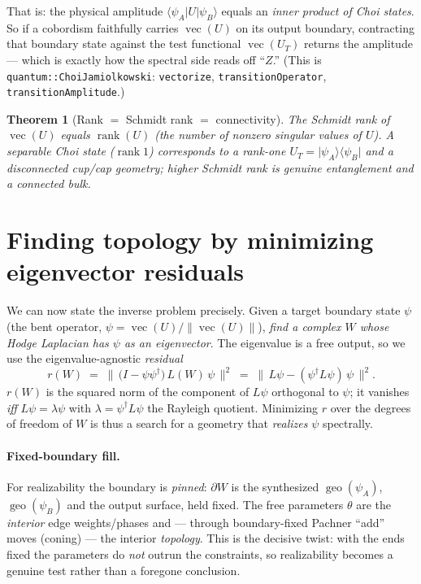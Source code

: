 \documentclass[11pt]{article}
\theoremstyle{plain}
\newtheorem{theorem}{Theorem}
\theoremstyle{definition}
\theoremstyle{remark}
\newcommand{\vecop}{\operatorname{vec}}
\newcommand{\rank}{\operatorname{rank}}
\newcommand{\ket}[1]{\lvert #1 \rangle}
\newcommand{\bra}[1]{\langle #1 \rvert}
\newcommand{\ip}[3]{\langle #1 \vert #2 \vert #3 \rangle}
\newcommand{\adj}{^{\dagger}}
\newcommand{\geo}{\operatorname{geo}}
\begin{document}
\noindent
That is: the physical amplitude $\ip{\psi_A}{U}{\psi_B}$ equals an
\emph{inner product of Choi states}. So if a cobordism faithfully carries
$\vecop(U)$ on its output boundary, contracting that boundary state against the
test functional $\vecop(U_T)$ returns the amplitude --- which is exactly how the
spectral side reads off ``$Z$.'' (This is \texttt{quantum::ChoiJamiolkowski}:
\texttt{vectorize}, \texttt{transitionOperator}, \texttt{transitionAmplitude}.)

\begin{theorem}[Rank $=$ Schmidt rank $=$ connectivity]
The Schmidt rank of $\vecop(U)$ equals $\rank(U)$ (the number of nonzero singular
values of $U$). A separable Choi state ($\rank 1$) corresponds to a rank-one
$U_T=\ket{\psi_A}\!\bra{\psi_B}$ and a \emph{disconnected} cup/cap geometry;
higher Schmidt rank is genuine entanglement and a \emph{connected} bulk.
\end{theorem}

\section{Finding topology by minimizing eigenvector residuals}\label{sec:residual}

We can now state the inverse problem precisely. Given a target boundary state
$\psi$ (the bent operator, $\psi=\vecop(U)/\lVert\vecop(U)\rVert$), \emph{find a
complex $W$ whose Hodge Laplacian has $\psi$ as an eigenvector}. The
eigenvalue is a free output, so we use the eigenvalue-agnostic
\emph{residual}
\begin{equation}
\boxed{\;
r(W) \;=\; \big\lVert\, \big(I - \psi\psi\adj\big)\,L(W)\,\psi \,\big\rVert^2
\;=\; \big\lVert\, L\psi - (\psi\adj L \psi)\,\psi \,\big\rVert^2 .
\;}
\end{equation}
$r(W)$ is the squared norm of the component of $L\psi$ orthogonal to $\psi$; it
vanishes \emph{iff} $L\psi = \lambda\psi$ with $\lambda = \psi\adj L\psi$ the
Rayleigh quotient. Minimizing $r$ over the degrees of freedom of $W$ is thus a
search for a geometry that \emph{realizes} $\psi$ spectrally.

\paragraph{Fixed-boundary fill.} For realizability the boundary is
\emph{pinned}: $\partial W$ is the synthesized $\geo(\psi_A)$, $\geo(\psi_B)$ and
the output surface, held fixed. The free parameters $\theta$ are the \emph{interior}
edge weights/phases and --- through boundary-fixed Pachner ``add'' moves (coning)
--- the interior \emph{topology}. This is the decisive twist: with the ends fixed
the parameters do \emph{not} outrun the constraints, so realizability becomes a
genuine test rather than a foregone conclusion.
\end{document}
